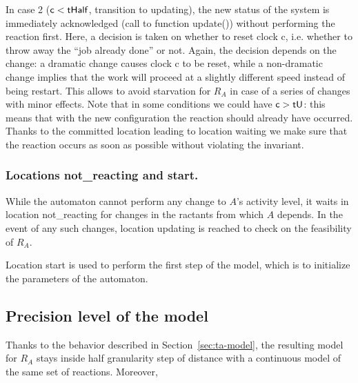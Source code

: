 \documentclass{llncs}
\begin{document}
In case 2 (${\sf c} < {\sf tHalf}$, transition to {\sf updating}), the new status of the system is
immediately acknowledged (call to function {\sf update()}) without
performing the reaction first. Here, a decision is taken on whether to reset clock {\sf c}, i.e. whether to
throw away the ``job already done'' or not. Again, the decision depends on the change: a dramatic change causes
clock {\sf c} to be reset, while a non-dramatic change implies that the work will proceed at a slightly different
speed instead of being restart. This allows to avoid starvation for $R_A$ in case of a series of changes
with minor effects. Note that in some conditions we could have
${\sf c} > {\sf tU}$: this means that with the new configuration the reaction should already have occurred. Thanks
to the committed location leading to location {\sf waiting} we make sure that the reaction occurs as soon as possible
without violating the invariant.

\subsubsection{Locations {\sf not\_reacting} and {\sf start}.} While the automaton cannot perform any change
to $A$'s activity level, it waits in location {\sf not\_reacting} for changes in the ractants from which $A$
depends. In the event of any such changes, location {\sf updating} is reached to check on the feasibility of $R_A$.

Location {\sf start} is used to perform the first step of the model, which is to initialize the parameters of the automaton.

\subsection{Precision level of the model}
Thanks to the behavior described in Section~\ref{sec:ta-model}, the resulting model for $R_A$ stays
inside half granularity step of distance with a continuous model of the same set of reactions. Moreover,
\end{document}
